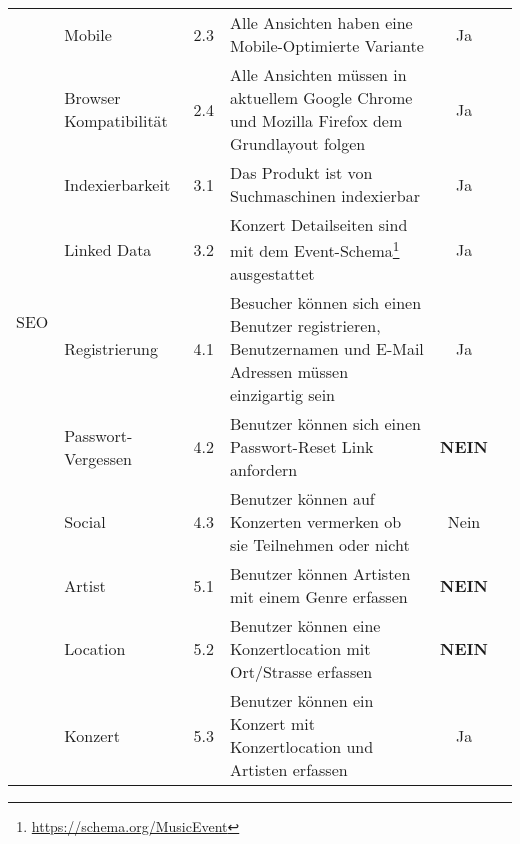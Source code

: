 \begin{longtable}[]{@{}p{1.9cm}p{2.5cm}cp{5.5cm}cc@{}}
                             & Mobile                     & 2.3          & Alle Ansichten haben eine Mobile-Optimierte Variante                                                        & Ja                              \\ \cline{2-6}
                             & Browser Kompatibilität     & 2.4          & Alle Ansichten müssen in aktuellem Google Chrome und Mozilla Firefox dem Grundlayout folgen                 & Ja                              \\
  \midrule
  \multirow{4}{*}{SEO}       & Indexierbarkeit            & 3.1          & Das Produkt ist von Suchmaschinen indexierbar                                                               & Ja                              \\ \cline{2-6}
                             & Linked Data                & 3.2          & Konzert Detailseiten sind mit dem Event-Schema\footnote{\url{https://schema.org/MusicEvent}} ausgestattet   & Ja                              \\
  \midrule
  \multirow{8}{*}{Benutzer}  & Registrierung              & 4.1          & Besucher können sich einen Benutzer registrieren, Benutzernamen und E-Mail Adressen müssen einzigartig sein & Ja                              \\ \cline{2-6}
                             & Passwort-Vergessen         & 4.2          & Benutzer können sich einen Passwort-Reset Link anfordern                                                    & \textbf{NEIN}                   \\ \cline{2-6}
                             & Social                     & 4.3          & Benutzer können auf Konzerten vermerken ob sie Teilnehmen oder nicht                                        & Nein                            \\
  \midrule
  \clearpage
  \multirow{6}{*}{Erfassung} & Artist                     & 5.1          & Benutzer können Artisten mit einem Genre erfassen                                                           & \textbf{NEIN}                   \\ \cline{2-6}
                             & Location                   & 5.2          & Benutzer können eine Konzertlocation mit Ort/Strasse erfassen                                               & \textbf{NEIN}                   \\ \cline{2-6}
                             & Konzert                    & 5.3          & Benutzer können ein Konzert mit Konzertlocation und Artisten erfassen                                       & Ja                              \\ \cline{2-6}

\end{longtable}
